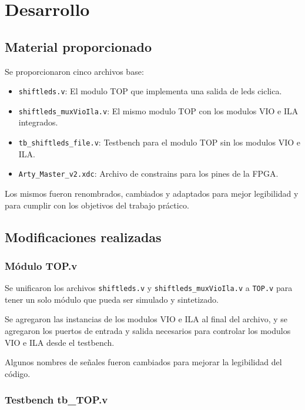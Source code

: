 \documentclass[11pt,a4paper]{article}
\begin{document}
\section{Desarrollo}

\subsection{Material proporcionado}

Se proporcionaron cinco archivos base:

\begin{itemize}
    \item \texttt{shiftleds.v}: El modulo TOP que implementa una salida de leds ciclica.
    \item \texttt{shiftleds\_muxVioIla.v}: El mismo modulo TOP con los modulos VIO e ILA integrados.
    \item \texttt{tb\_shiftleds\_file.v}: Testbench para el modulo TOP sin los modulos VIO e ILA.\@
    \item \texttt{Arty\_Master\_v2.xdc}: Archivo de constrains para los pines de la FPGA.\@
\end{itemize}

Los mismos fueron renombrados, cambiados y adaptados para mejor legibilidad y
para cumplir con los objetivos del trabajo práctico.

\subsection{Modificaciones realizadas}

\subsubsection{Módulo TOP.v}

Se unificaron los archivos \texttt{shiftleds.v} y
\texttt{shiftleds\_muxVioIla.v} a \texttt{TOP.v} para tener un solo módulo que
pueda ser simulado y sintetizado.

Se agregaron las instancias de los modulos VIO e ILA al final del archivo, y se
agregaron los puertos de entrada y salida necesarios para controlar los modulos
VIO e ILA desde el testbench.

Algunos nombres de señales fueron cambiados para mejorar la legibilidad del
código.

\subsubsection{Testbench tb\_TOP.v}
\end{document}
